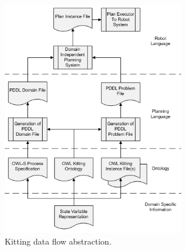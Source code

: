 \begin{figure}[htb]
\includegraphics[width=8cm]{images/ProcessDataFlowV2.jpg}
\caption{Kitting data flow abstraction.}
\label{fig:ProcessDataFlow}
\end{figure}

